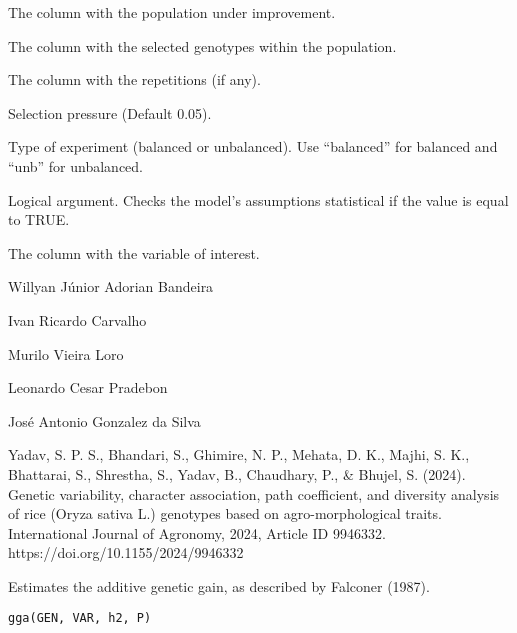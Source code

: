 \documentclass[a4paper]{book}
\begin{document}
\begin{Arguments}
\begin{ldescription}
\item[\code{POP}] The column with the population under improvement.

\item[\code{GEN}] The column with the selected genotypes within the population.

\item[\code{REP}] The column with the repetitions (if any).

\item[\code{K}] Selection pressure (Default 0.05).

\item[\code{type}] Type of experiment (balanced or unbalanced). Use
“balanced” for balanced and “unb” for unbalanced.

\item[\code{check}] Logical argument. Checks the model's assumptions
statistical if the value is equal to TRUE.

\item[\code{VAR}] The column with the variable of interest.
\end{ldescription}
\end{Arguments}
%
\begin{Author}
Willyan Júnior Adorian Bandeira

Ivan Ricardo Carvalho

Murilo Vieira Loro

Leonardo Cesar Pradebon

José Antonio Gonzalez da Silva
\end{Author}
%
\begin{References}
Yadav, S. P. S., Bhandari, S., Ghimire, N. P., Mehata, D. K., Majhi, S. K.,
Bhattarai, S., Shrestha, S., Yadav, B., Chaudhary, P., \& Bhujel, S. (2024).
Genetic variability, character association, path coefficient, and diversity
analysis of rice (Oryza sativa L.) genotypes based on agro-morphological
traits. International Journal of Agronomy, 2024, Article ID 9946332.
https://doi.org/10.1155/2024/9946332
\end{References}
%
\begin{Description}
Estimates the additive genetic gain, as described by Falconer (1987).
\end{Description}
%
\begin{Usage}
\begin{verbatim}
gga(GEN, VAR, h2, P)
\end{verbatim}
\end{Usage}
\end{document}
